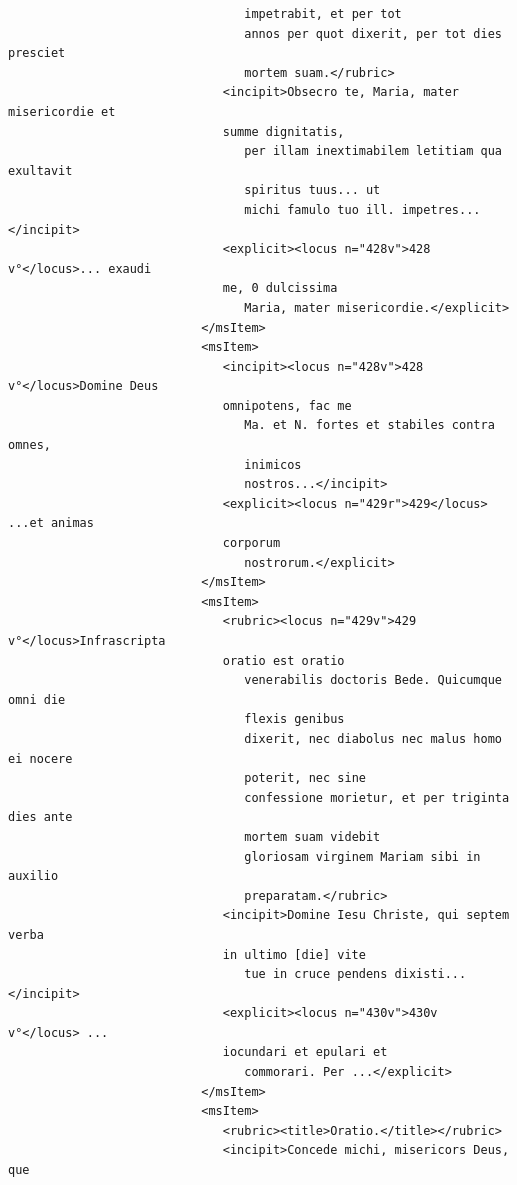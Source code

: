 \documentclass[a4paper,12pt,twoside]{book}
\begin{document}
\begin{verbatim}
                                 impetrabit, et per tot
                                 annos per quot dixerit, per tot dies presciet 
                                 mortem suam.</rubric>
                              <incipit>Obsecro te, Maria, mater misericordie et 
                              summe dignitatis,
                                 per illam inextimabilem letitiam qua exultavit
                                 spiritus tuus... ut
                                 michi famulo tuo ill. impetres... </incipit>
                              <explicit><locus n="428v">428 v°</locus>... exaudi
                              me, 0 dulcissima
                                 Maria, mater misericordie.</explicit>
                           </msItem>
                           <msItem>
                              <incipit><locus n="428v">428 v°</locus>Domine Deus
                              omnipotens, fac me
                                 Ma. et N. fortes et stabiles contra omnes, 
                                 inimicos
                                 nostros...</incipit>
                              <explicit><locus n="429r">429</locus> ...et animas 
                              corporum
                                 nostrorum.</explicit>
                           </msItem>
                           <msItem>
                              <rubric><locus n="429v">429 v°</locus>Infrascripta
                              oratio est oratio
                                 venerabilis doctoris Bede. Quicumque omni die 
                                 flexis genibus
                                 dixerit, nec diabolus nec malus homo ei nocere 
                                 poterit, nec sine
                                 confessione morietur, et per triginta dies ante
                                 mortem suam videbit
                                 gloriosam virginem Mariam sibi in auxilio 
                                 preparatam.</rubric>
                              <incipit>Domine Iesu Christe, qui septem verba 
                              in ultimo [die] vite
                                 tue in cruce pendens dixisti... </incipit>
                              <explicit><locus n="430v">430v v°</locus> ...
                              iocundari et epulari et
                                 commorari. Per ...</explicit>
                           </msItem>
                           <msItem>
                              <rubric><title>Oratio.</title></rubric>
                              <incipit>Concede michi, misericors Deus, que 

\end{verbatim}
\end{document}
